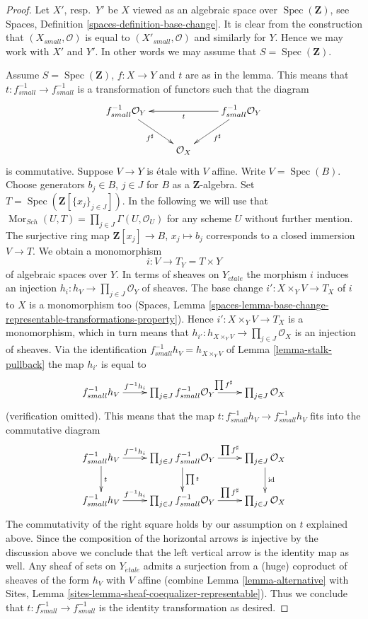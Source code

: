 \documentclass{stacks-project}
\theoremstyle{plain}
\theoremstyle{definition}
\theoremstyle{remark}
\numberwithin{equation}{subsection}
\def\Spec{\mathop{\mathrm{Spec}}}
\def\Sch{\mathit{Sch}}
\def\Mor{\mathop{\mathrm{Mor}}\nolimits}
\def\etale{{\acute{e}tale}}
\begin{document}
\begin{proof}
Let $X'$, resp.\ $Y'$ be $X$ viewed as an algebraic space over
$\Spec(\mathbf{Z})$, see
Spaces, Definition \ref{spaces-definition-base-change}.
It is clear from the construction that $(X_{small}, \mathcal{O})$
is equal to $(X'_{small}, \mathcal{O})$ and similarly for $Y$.
Hence we may work with $X'$ and $Y'$. In other words we may
assume that $S = \Spec(\mathbf{Z})$.

\medskip\noindent
Assume $S = \Spec(\mathbf{Z})$, $f : X \to Y$ and $t$ are as in
the lemma. This means that $t : f^{-1}_{small} \to f^{-1}_{small}$
is a transformation of functors such that the diagram
$$
\xymatrix{
f_{small}^{-1}\mathcal{O}_Y
\ar[rd]_{f^\sharp}  & &
f_{small}^{-1}\mathcal{O}_Y \ar[ll]^t \ar[ld]^{f^\sharp} \\
& \mathcal{O}_X
}
$$
is commutative. Suppose $V \to Y$ is \'etale with $V$ affine.
Write $V = \Spec(B)$. Choose generators $b_j \in B$, $j \in J$
for $B$ as a $\mathbf{Z}$-algebra. Set
$T = \Spec(\mathbf{Z}[\{x_j\}_{j \in J}])$.
In the following we will use that
$\Mor_{\Sch}(U, T) = \prod_{j \in J} \Gamma(U, \mathcal{O}_U)$
for any scheme $U$ without further mention.
The surjective ring map $\mathbf{Z}[x_j] \to B$, $x_j \mapsto b_j$
corresponds to a closed immersion $V \to T$.
We obtain a monomorphism
$$
i : V \longrightarrow T_Y = T \times Y
$$
of algebraic spaces over $Y$. In terms of sheaves on $Y_\etale$
the morphism $i$ induces an injection
$h_i : h_V \to \prod_{j \in J} \mathcal{O}_Y$ of sheaves.
The base change $i' : X \times_Y V \to T_X$ of $i$ to $X$
is a monomorphism too
(Spaces,
Lemma \ref{spaces-lemma-base-change-representable-transformations-property}).
Hence $i' : X \times_Y V \to T_X$ is a monomorphism, which
in turn means that
$h_{i'} : h_{X \times_Y V} \to \prod_{j \in J} \mathcal{O}_X$
is an injection of sheaves.
Via the identification $f_{small}^{-1}h_V = h_{X \times_Y V}$ of
Lemma \ref{lemma-stalk-pullback}
the map $h_{i'}$ is equal to
$$
\xymatrix{
f_{small}^{-1}h_V \ar[r]^-{f^{-1}h_i} &
\prod_{j \in J} f_{small}^{-1}\mathcal{O}_Y
\ar[r]^{\prod f^\sharp} &
\prod_{j \in J} \mathcal{O}_X
}
$$
(verification omitted). This means that the map
$t : f_{small}^{-1}h_V \to f_{small}^{-1}h_V$
fits into the commutative diagram
$$
\xymatrix{
f_{small}^{-1}h_V \ar[r]^-{f^{-1}h_i} \ar[d]^t &
\prod_{j \in J} f_{small}^{-1}\mathcal{O}_Y
\ar[r]^-{\prod f^\sharp} \ar[d]^{\prod t} &
\prod_{j \in J} \mathcal{O}_X \ar[d]^{\text{id}}\\
f_{small}^{-1}h_V \ar[r]^-{f^{-1}h_i} &
\prod_{j \in J} f_{small}^{-1}\mathcal{O}_Y
\ar[r]^-{\prod f^\sharp} &
\prod_{j \in J} \mathcal{O}_X
}
$$
The commutativity of the right square holds by our assumption on $t$
explained above.
Since the composition of the horizontal arrows is injective
by the discussion above we conclude that the left vertical arrow
is the identity map as well. Any sheaf of sets on
$Y_\etale$ admits a surjection from a (huge) coproduct of sheaves
of the form $h_V$ with $V$ affine (combine
Lemma \ref{lemma-alternative}
with
Sites, Lemma \ref{sites-lemma-sheaf-coequalizer-representable}).
Thus we conclude that $t : f_{small}^{-1} \to f_{small}^{-1}$
is the identity transformation as desired.
\end{proof}
\end{document}
